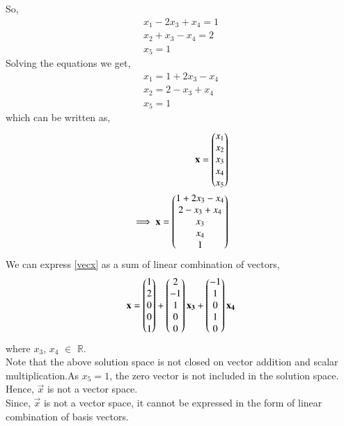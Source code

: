 \documentclass[journal,12pt,twocolumn]{IEEEtran}
\begin{document}
So,
\begin{align}
x_1-2x_3+x_4=1\\
x_2+x_3-x_4=2\\
x_5=1
\end{align}
Solving the equations we get,
\begin{align}
x_1=1+2x_3-x_4\\
x_2=2-x_3+x_4\\
x_5=1
\end{align}
which can be written as,
   \begin{align}
   \mathbf{x} = \begin{pmatrix}x_1\\x_2\\x_3 \\ x_4 \\ x_5\end{pmatrix}\\
   \implies \mathbf{x}=\begin{pmatrix}1+2x_3-x_4\\2-x_3+x_4\\x_3\\x_4\\1\end{pmatrix}\label{vecx}
\end{align}
We can express \eqref{vecx} as a sum of linear combination of vectors,
\begin{align}
    \mathbf{x}=\begin{pmatrix}1\\2\\0\\0\\1\end{pmatrix}+\begin{pmatrix}2\\-1\\1\\0\\0\end{pmatrix}\mathbf{x_3}+\begin{pmatrix}-1\\1\\0\\1\\0\end{pmatrix}\mathbf{x_4}
\end{align}
where $x_3$, $x_4$ $\in$ $\mathbb{R}$.\\
Note that the above solution space is not closed on vector addition and scalar multiplication.As $x_5=1$, the zero vector is not included in the solution space. Hence, $\vec{x}$ is not a vector space. \\
Since, $\vec{x}$ is not a vector space, it cannot be expressed in the form of linear combination of basis vectors.
\end{document}
